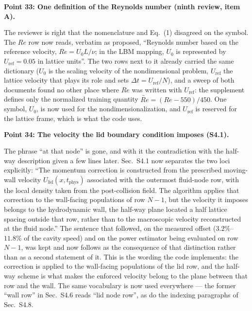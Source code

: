 \documentclass[11pt,a4paper]{article}
\begin{document}
\vspace{1em}

\noindent\textbf{Point 33: One definition of the Reynolds number (ninth review, item A).}

The reviewer is right that the nomenclature and Eq.~(1) disagreed on the symbol. The
$Re$ row now reads, verbatim as proposed, ``Reynolds number based on the reference
velocity, $Re=U_0L/\nu$; in the LBM mapping, $U_0$ is represented by
$U_{\mathrm{ref}}=0.05$ in lattice units''. The two rows next to it already carried the
same dictionary ($U_0$ is the scaling velocity of the nondimensional problem,
$U_{\mathrm{ref}}$ the lattice velocity that plays its role and sets
$\Delta t=U_{\mathrm{ref}}/N$), and a sweep of both documents found no other place
where $Re$ was written with $U_{\mathrm{ref}}$: the supplement defines only the
normalized training quantity $\widetilde{Re}=(Re-550)/450$. One symbol, $U_0$, is now
used for the nondimensionalization, and $U_{\mathrm{ref}}$ is reserved for the lattice
frame, which is what the code uses.

\vspace{1em}

\noindent\textbf{Point 34: The velocity the lid boundary condition imposes (S4.1).}

The phrase ``at that node'' is gone, and with it the contradiction with the half-way
description given a few lines later. Sec.~S4.1 now separates the two loci explicitly:
``The momentum correction is constructed from the prescribed moving-wall velocity
$U_{\mathrm{lid}}(x,t_{\mathrm{phys}})$ associated with the outermost fluid-node row,
with the local density taken from the post-collision field. The algorithm applies that
correction to the wall-facing populations of row $N-1$, but the velocity it imposes
belongs to the hydrodynamic wall, the half-way plane located a half lattice spacing
outside that row, rather than to the macroscopic velocity reconstructed at the fluid
node.'' The sentence that followed, on the measured offset ($3.2\%$--$11.8\%$ of the
cavity speed) and on the power estimator being evaluated on row $N-1$, was kept and now
follows as the consequence of that distinction rather than as a second statement of it.
This is the wording the code implements: the correction is applied to the wall-facing
populations of the lid row, and the half-way scheme is what makes the enforced velocity
belong to the plane between that row and the wall. The same vocabulary is now used
everywhere --- the former ``wall row'' in Sec.~S4.6 reads ``lid node row'', as do the
indexing paragraphs of Sec.~S4.8.
\end{document}
